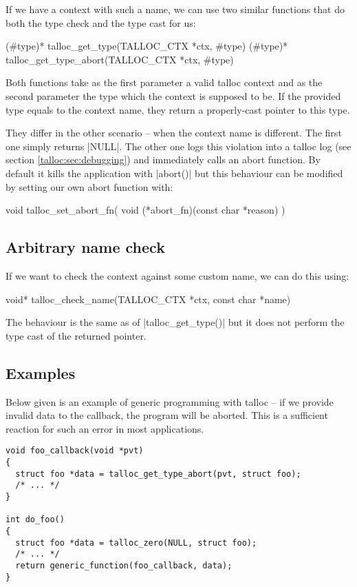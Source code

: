 If we have a context with such a name, we can use two similar functions that do
both the type check and the type cast for us:

\begin{funcproto}
(#type)* talloc_get_type(TALLOC_CTX *ctx, #type)
(#type)* talloc_get_type_abort(TALLOC_CTX *ctx, #type)
\end{funcproto}
\funclistend
Both functions take as the first parameter a valid talloc context and as the
second parameter the type which the context is supposed to be. If the provided
type equals to the context name, they return a properly-cast pointer to
this type.

They differ in the other scenario -- when the context name is different. The
first one simply returns |NULL|. The other one logs this violation into a talloc
log (see section \ref{talloc:sec:debugging}) and immediately calls an abort
function. By default it kills the application with |abort()| but this behaviour
can be modified by setting our own abort function with:

\newpage
\begin{funcproto}
void talloc_set_abort_fn(
  void (*abort_fn)(const char *reason)
)
\end{funcproto}

\subsection{Arbitrary name check}

If we want to check the context against some custom name, we can do this using:

\begin{funcproto}
void* talloc_check_name(TALLOC_CTX *ctx, const char *name)
\end{funcproto}
\funclistend
The behaviour is the same as of |talloc_get_type()| but it does not perform the
type cast of the returned pointer.

\subsection{Examples}

Below given is an example of generic programming with talloc -- if we provide
invalid data to the callback, the program will be aborted. This is a sufficient
reaction for such an error in most applications.

\begin{lstlisting}[caption={Dynamic type system \#1}]
void foo_callback(void *pvt)
{
  struct foo *data = talloc_get_type_abort(pvt, struct foo);
  /* ... */
}

int do_foo()
{
  struct foo *data = talloc_zero(NULL, struct foo);
  /* ... */
  return generic_function(foo_callback, data);
}
\end{lstlisting}

